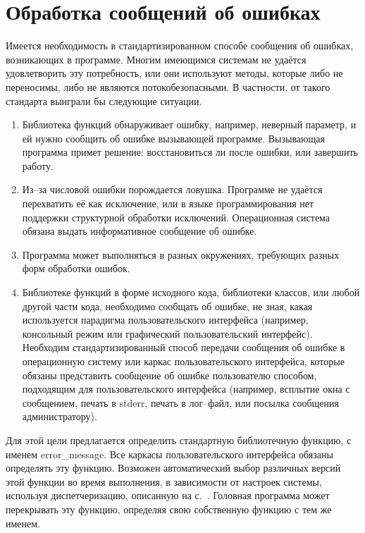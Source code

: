 \documentclass[forwardcom.tex]{subfiles}
\begin{document}
\section{Обработка сообщений об ошибках} \label{errorMessageHandling}
Имеется необходимость в стандартизированном способе сообщения об ошибках, возникающих в программе. Многим имеющимся системам не удаётся удовлетворить эту потребность, или они используют методы, которые либо не переносимы, либо не являются потокобезопасными. В частности, от такого стандарта выиграли бы следующие ситуации.
\begin{enumerate}
\item Библиотека функций обнаруживает ошибку, например, неверный параметр, и ей нужно сообщить об ошибке вызывающей программе. Вызывающая программа примет решение: восстановиться ли после ошибки, или завершить работу.

\item Из--за числовой ошибки порождается ловушка. Программе не удаётся перехватить её как исключение, или в языке программирования нет поддержки структурной обработки исключений. Операционная система обязана выдать информативное сообщение об ошибке.

\item Программа может выполняться в разных окружениях, требующих разных форм обработки ошибок. 

\item Библиотеке функций в форме исходного кода, библиотеки классов, или любой другой части кода, необходимо сообщать об ошибке, не зная, какая используется парадигма пользовательского интерфейса (например, консольный режим или графический пользовательский интерфейс). Необходим стандартизированный способ передачи сообщения об ошибке в операционную систему или каркас пользовательского интерфейса, которые обязаны представить сообщение об ошибке пользователю способом, подходящим для пользовательского интерфейса (например, всплытие окна с сообщением, печать в stderr, печать в лог--файл, или посылка сообщения администратору).
\end{enumerate}

\label{errorReportFunction}
Для этой цели предлагается определить стандартную библиотечную функцию, с именем error\_message. Все каркасы пользовательского интерфейса обязаны определять эту функцию. Возможен автоматический выбор различных версий этой функции во время выполнения, в зависимости от настроек системы, используя диспетчеризацию, описанную на с.~\pageref{libraryFunctionDispatchSystem}. Головная программа может перекрывать эту функцию, определяя свою собственную функцию с тем же именем.
\end{document}

